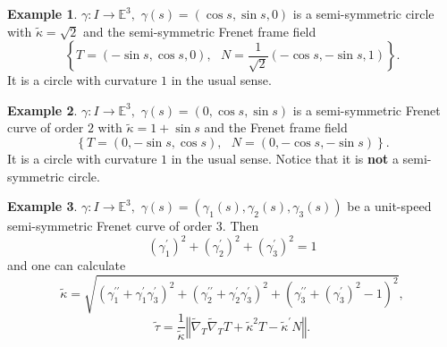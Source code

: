 \documentclass{amsart}
\theoremstyle{plain}
\theoremstyle{definition}
\newtheorem{example}{Example}
\theoremstyle{remark}
\numberwithin{equation}{section}
\begin{document}
\begin{example}
$\gamma :I\rightarrow \mathbb{E}^{3},$ $\gamma \left( s\right) =\left( \cos
s,\sin s,0\right) $ is a semi-symmetric circle with $\widetilde{\kappa }=%
\sqrt{2}$ and the semi-symmetric Frenet frame field%
\begin{equation*}
\left\{ T=\left( -\sin s,\cos s,0\right) ,\text{ }N=\frac{1}{\sqrt{2}}\left(
-\cos s,-\sin s,1\right) \right\} .
\end{equation*}%
It is a circle with curvature $1$ in the usual sense.
\end{example}

\begin{example}
$\gamma :I\rightarrow \mathbb{E}^{3},$ $\gamma \left( s\right) =\left(
0,\cos s,\sin s\right) $ is a semi-symmetric Frenet curve of order $2$ with $%
\widetilde{\kappa }=1+\sin s$ and the Frenet frame field%
\begin{equation*}
\left\{ T=\left( 0,-\sin s,\cos s\right) ,\text{ }N=\left( 0,-\cos s,-\sin
s\right) \right\} .
\end{equation*}%
It is a circle with curvature $1$ in the usual sense. Notice that it is 
\textbf{not} a semi-symmetric circle.
\end{example}

\begin{example}
$\gamma :I\rightarrow \mathbb{E}^{3},$ $\gamma \left( s\right) =\left(
\gamma _{1}(s),\gamma _{2}(s),\gamma _{3}(s)\right) $ be a unit-speed
semi-symmetric Frenet curve of order $3$. Then 
\begin{equation*}
\left( \gamma _{1}^{\prime }\right) ^{2}+\left( \gamma _{2}^{\prime }\right)
^{2}+\left( \gamma _{3}^{\prime }\right) ^{2}=1
\end{equation*}%
and one can calculate%
\begin{equation*}
\widetilde{\kappa }=\sqrt{\left( \gamma _{1}^{\prime \prime }+\gamma
_{1}^{\prime }\gamma _{3}^{\prime }\right) ^{2}+\left( \gamma _{2}^{\prime
\prime }+\gamma _{2}^{\prime }\gamma _{3}^{\prime }\right) ^{2}+\left(
\gamma _{3}^{\prime \prime }+\left( \gamma _{3}^{\prime }\right)
^{2}-1\right) ^{2}},
\end{equation*}%
\begin{equation*}
\widetilde{\tau }=\frac{1}{\widetilde{\kappa }}\left\Vert \widetilde{\nabla }%
_{T}\widetilde{\nabla }_{T}T+\widetilde{\kappa }^{2}T-\widetilde{\kappa }%
^{\prime }N\right\Vert .
\end{equation*}
\end{example}
\end{document}
